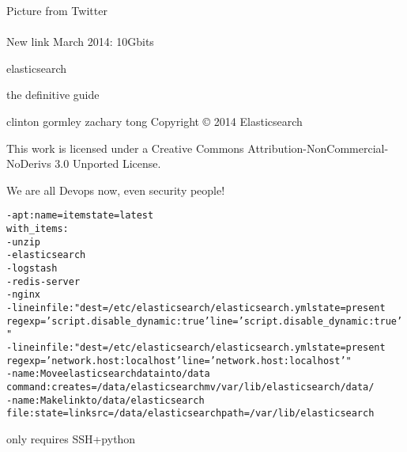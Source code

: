 \documentclass[20pt,landscape,a4paper,footrule]{foils}
\begin{document}

Picture from Twitter\\
\\

New link March 2014: 10Gbits\\
{\small{}}




{\color{green}\Large elasticsearch}

the definitive guide

clinton gormley
zachary tong
Copyright © 2014 Elasticsearch

This work is licensed under a Creative Commons Attribution-NonCommercial-NoDerivs 3.0 Unported License.

{\small
{}


}

\centerline{We are all Devops now, even security people!}


\begin{alltt}\small
- apt: name={{ item }} state=latest
  with_items:
        - unzip
        - elasticsearch
        - logstash
        - redis-server
        - nginx
- lineinfile: "dest=/etc/elasticsearch/elasticsearch.yml state=present
  regexp='script.disable_dynamic: true' line='script.disable_dynamic: true'"
- lineinfile: "dest=/etc/elasticsearch/elasticsearch.yml state=present
  regexp='network.host: localhost' line='network.host: localhost'"
- name: Move elasticsearch data into /data
  command: creates=/data/elasticsearch mv /var/lib/elasticsearch /data/
- name: Make link to /data/elasticsearch
  file: state=link src=/data/elasticsearch path=/var/lib/elasticsearch
\end{alltt}
\vskip 5mm
\centerline{only requires SSH+python }



\end{document}
